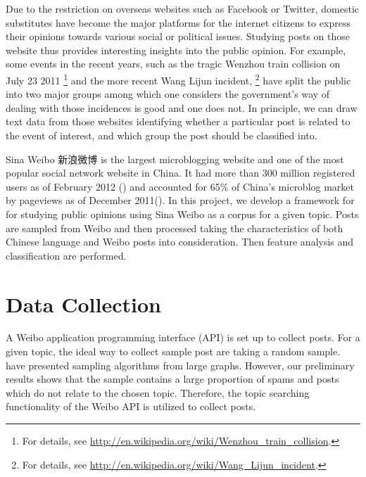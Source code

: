 \documentclass[11pt]{article}
\newcommand{\1}[1]{{\mathbf 1}\left\{#1\right\}}        %
\begin{document}
Due to the restriction on overseas websites such as Facebook or Twitter, domestic substitutes have become the major platforms for the internet citizens to express their opinions towards various social or political issues. Studying posts on those website thus provides interesting insights into the public opinion. For example, some events in the recent years, such as the tragic Wenzhou train collision on July 23 2011
\footnote{For details, see \url{http://en.wikipedia.org/wiki/Wenzhou_train_collision}. }
  and the more recent Wang Lijun incident,
\footnote{For details, see \url{http://en.wikipedia.org/wiki/Wang_Lijun_incident}.}  
have split the public into two major groups among which one considers the government's way of dealing with those incidences is good and one does not. 
In principle, we can draw text data from those websites identifying whether a particular post is related to the event of interest, and which group the post should be classified into.

Sina Weibo 新浪微博 is the largest microblogging website and one of the most popular social network website in China. It had more than 300 million registered users as of February 2012 (\cite{bloombergSina})
and accounted for 65\% of China's microblog market by pageviews as of December 2011(\cite{WashingtonPostSina}).
In this project, we develop a framework for for studying public opinions using Sina Weibo as a corpus for a given topic. Posts are sampled from Weibo and then processed taking the characteristics of both Chinese language and Weibo posts into consideration. Then feature analysis and classification are performed. 






\section{Data Collection}\label{subsec:datacol}

A Weibo  application programming interface (API) is set up to collect posts.
For a given topic, the ideal way to collect sample post are taking a random sample. \cite{boyd2004fastest, leskovec2006sampling, wang2011understanding} have presented sampling algorithms from large graphs. However, our preliminary results shows that the sample contains a large proportion of spams and posts which do not relate to the chosen topic. Therefore, the topic searching functionality of the Weibo API is utilized to collect posts. 
\end{document}
